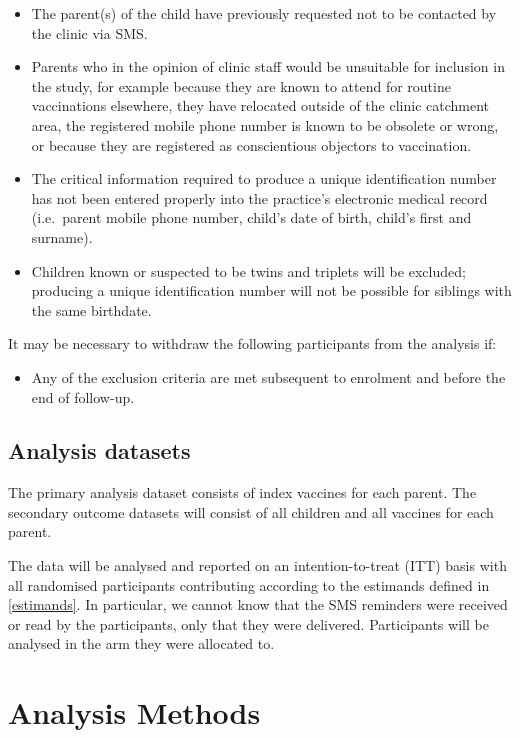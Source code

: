 \documentclass[
  bibliography=totoc]{scrreprt}
\providecommand{\tightlist}{%
  \setlength{\itemsep}{0pt}\setlength{\parskip}{0pt}}
\begin{document}
\begin{itemize}
\tightlist
\item
  The parent(s) of the child have previously requested not to be contacted by the clinic via SMS.
\item
  Parents who in the opinion of clinic staff would be unsuitable for inclusion in the study, for example because they are known to attend for routine vaccinations elsewhere, they have relocated outside of the clinic catchment area, the registered mobile phone number is known to be obsolete or wrong, or because they are registered as conscientious objectors to vaccination.
\item
  The critical information required to produce a unique identification number has not been entered properly into the practice's electronic medical record (i.e.~parent mobile phone number, child's date of birth, child's first and surname).
\item
  Children known or suspected to be twins and triplets will be excluded; producing a unique identification number will not be possible for siblings with the same birthdate.
\end{itemize}

It may be necessary to withdraw the following participants from the analysis if:

\begin{itemize}
\tightlist
\item
  Any of the exclusion criteria are met subsequent to enrolment and before the end of follow-up.
\end{itemize}

\hypertarget{analysis-datasets}{%
\section{Analysis datasets}\label{analysis-datasets}}

The primary analysis dataset consists of index vaccines for each parent.
The secondary outcome datasets will consist of all children and all vaccines for each parent.

The data will be analysed and reported on an intention-to-treat (ITT) basis with all randomised participants contributing according to the estimands defined in \ref{estimands}.
In particular, we cannot know that the SMS reminders were received or read by the participants, only that they were delivered.
Participants will be analysed in the arm they were allocated to.

\hypertarget{analysis-methods}{%
\chapter{Analysis Methods}\label{analysis-methods}}
\end{document}
